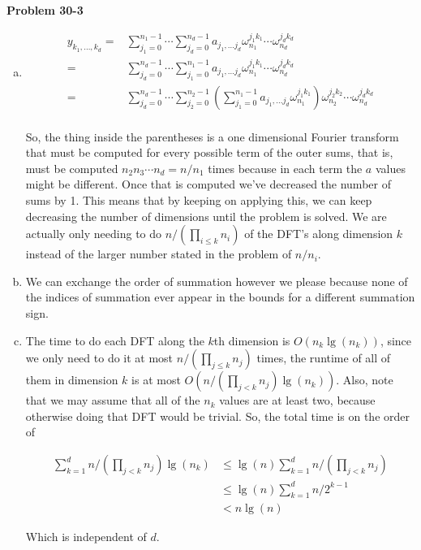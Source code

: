 \documentclass{article}
\begin{document}
\noindent\textbf{Problem 30-3}\\

\begin{enumerate}[a.]
\item
\begin{align*}
y_{k_1,\ldots,k_d} =& \sum_{j_1=0}^{n_1-1} \cdots \sum_{j_d=0}^{n_d-1} a_{j_1,\ldots j_d} \omega_{n_1}^{j_1k_1}\cdots \omega_{n_d}^{j_d k_d}\\
=&\sum_{j_d=0}^{n_d-1} \cdots \sum_{j_1=0}^{n_1-1} a_{j_1,\ldots j_d} \omega_{n_1}^{j_1k_1}\cdots \omega_{n_d}^{j_d k_d}\\
=&\sum_{j_d=0}^{n_d-1} \cdots \sum_{j_2=0}^{n_2-1}\left(\sum_{j_1=0}^{n_1-1} a_{j_1,\ldots j_d} \omega_{n_1}^{j_1k_1}\right)\omega_{n_2}^{j_2k_2}\cdots \omega_{n_d}^{j_d k_d}\\
\end{align*}

So, the thing inside the parentheses is a one dimensional Fourier transform that must be computed for every possible term of the outer sums, that is, must be computed $n_2 n_3 \cdots n_d = n/n_1$ times because in each term the $a$ values might be different. Once that is computed we've decreased the number of sums by 1. This means that by keeping on applying this, we can keep decreasing the number of dimensions until the problem is solved. We are actually only needing to do $n/(\prod_{i\le k} n_i)$ of the DFT's along dimension $k$ instead of the larger number stated in the problem of $n/n_i$.
\item
We can exchange the order of summation however we please because none of the indices of summation ever appear in the bounds for a different summation sign.
\item
The time to do each DFT along the $k$th dimension is $O(n_k\lg(n_k))$, since we only need to do it at most $n/(\prod_{j\le k} n_j)$ times, the runtime of all of them in dimension $k$ is at most $O(n/(\prod_{j<k} n_j)\lg(n_k))$. Also, note that we may assume that all of the $n_k$ values are at least two, because otherwise doing that DFT would be trivial. So, the total time is on the order of

\begin{align*}
\sum_{k=1}^d n/\left(\prod_{j<k} n_j\right) \lg(n_k) &\le \lg(n) \sum_{k=1}^d n/\left(\prod_{j<k} n_j\right) \\
&\le\lg(n) \sum_{k=1}^d n/2^{k-1}\\
&< n\lg(n)
\end{align*}

Which is independent of $d$.

\end{enumerate}
\end{document}
